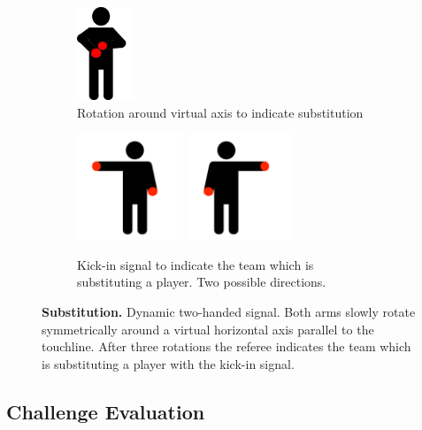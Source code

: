 \begin{figure}[ht!]
    \centering
    \begin{subfigure}{.33\textwidth}
        \centering
        \includegraphics[height=105px]{figs/technical_challenges/substitution.png}
        \vspace*{0.5em}
        \caption{Rotation around virtual axis to indicate substitution}
    \end{subfigure}
    \hspace*{0.5em}
    \begin{subfigure}{.6\textwidth}
        \centering
        \includegraphics[height=120px]{figs/technical_challenges/kick-in.png}
        \includegraphics[height=120px]{figs/technical_challenges/kick-in-flipped.png}
        \caption{Kick-in signal to indicate the team which is substituting a player. Two possible directions.}
    \end{subfigure}
    \caption{\textbf{Substitution.} Dynamic two-handed signal. Both arms slowly rotate symmetrically around a virtual horizontal axis parallel to the touchline. After three rotations the referee indicates the team which is substituting a player with the kick-in signal.}
\end{figure}

\clearpage
\newpage

\subsection{Challenge Evaluation}

